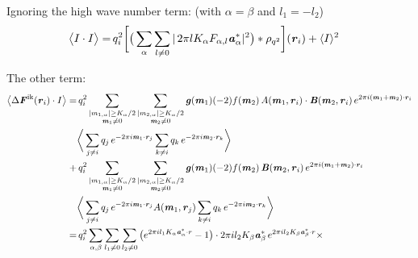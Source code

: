 \documentclass[aps,pre,preprint]{revtex4}
\renewcommand{\v}[1]{\textbf{\textit{#1}}}
\begin{document}
Ignoring the high wave number term: (with $\alpha = \beta$ and $l_1 = -l_2$)
\begin{align}\nonumber
  \big\langle
  I\cdot I
  \big\rangle
  = &\, 
  q_i^2
  \bigg[
  \big(
  \sum_{\alpha}\sum_{l\neq 0}
  \vert\,
  2\pi l K_\alpha F_{\alpha,l} \v a_\alpha^\ast\vert^2
  \big)
  \ast \rho_{q^2}
  \bigg]
  (\v r_i) + 
  \langle I\rangle^2
\end{align}


The other term:
\begin{align}\nonumber
  \big\langle
  \Delta\v F^{\textrm{ik}}(\v r_i)\cdot I
  \big\rangle
  = &\,
  q^2_i
  \sum_{
    \begin{subarray}{c}
      \vert m_{1,\alpha}\vert \geq K_\alpha/2\\
      \v m_1\neq 0
    \end{subarray}}
  \sum_{
    \begin{subarray}{c}
      \vert m_{2,\alpha}\vert \geq K_\alpha/2\\
      \v m_2\neq 0
    \end{subarray}}
  \v g(\v m_1) (-2)f(\v m_2) \,
  A(\v m_1, \v r_i)\cdot\v B(\v m_2, \v r_i)
  \,e^{2\pi i(\v m_1 + \v m_2)\cdot\v r_i} \\  \nonumber
  &
  \bigg\langle
  \sum_{j\neq i}q_j\,e^{-2\pi i\v m_1\cdot\v r_j}  
  \sum_{k\neq i}q_k\,e^{-2\pi i\v m_2\cdot\v r_k}
  \bigg\rangle \\\nonumber
  + &\,
  q^2_i
  \sum_{
    \begin{subarray}{c}
      \vert m_{1,\alpha}\vert \geq K_\alpha/2\\
      \v m_1\neq 0
    \end{subarray}}
  \sum_{
    \begin{subarray}{c}
      \vert m_{2,\alpha}\vert \geq K_\alpha/2\\
      \v m_2\neq 0
    \end{subarray}}
  \v g(\v m_1) (-2)f(\v m_2) \,
  \v B(\v m_2, \v r_i)
  \,e^{2\pi i(\v m_1 + \v m_2)\cdot\v r_i} \\  \nonumber
  &
  \bigg\langle
  \sum_{j\neq i}q_j\,e^{-2\pi i\v m_1\cdot\v r_j}A(\v m_1, \v r_j)
  \sum_{k\neq i}q_k\,e^{-2\pi i\v m_2\cdot\v r_k}
  \bigg\rangle \\\nonumber
  =&\,
  q^2_i
  \sum_{\alpha, \beta}\sum_{l_1\neq 0}\sum_{l_2\neq 0}
  \big(
  e^{2\pi i l_1 K_\alpha\v a_\alpha^\ast\cdot r} - 1
  \big)
  \cdot
  2\pi i l_2K_\beta \v a_\beta ^\ast\,e^{2\pi i l_2 K_\beta \v a_\beta^\ast\cdot r} \times \\\nonumber

\end{align}
\end{document}
